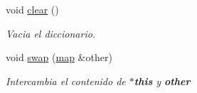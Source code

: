 \begin{Indent}
\begin{DoxyCompactItemize}
void \hyperlink{classaed2_1_1map_a2bfa5165825979bf2431db55bc6bc9ca_a2bfa5165825979bf2431db55bc6bc9ca}{clear} ()
\begin{DoxyCompactList}\small\item\em Vacia el diccionario. \end{DoxyCompactList}\item 
void \hyperlink{classaed2_1_1map_a43ddb71cc91e5c6021a7a1f243d6cc4a_a43ddb71cc91e5c6021a7a1f243d6cc4a}{swap} (\hyperlink{classaed2_1_1map}{map} \&other)
\begin{DoxyCompactList}\small\item\em Intercambia el contenido de {\bfseries $\ast$this} y {\bfseries other} \end{DoxyCompactList}\end{DoxyCompactItemize}
\end{Indent}
